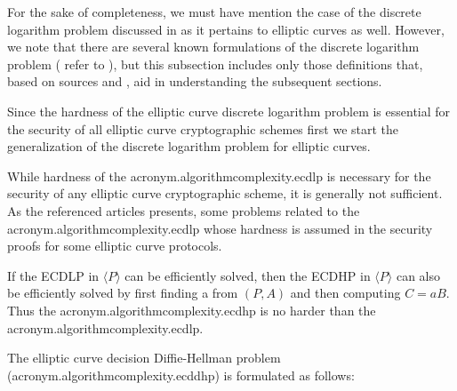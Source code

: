 For the sake of completeness, we must have mention the case of the discrete logarithm problem discussed in  as it pertains to elliptic curves as well.  However, we note that there are several known formulations of the discrete logarithm problem ( refer to \cite{maya6} ), but this subsection includes only those definitions that, based on sources \cite{menezes2004ECC} and \cite{BF01}, aid in understanding the subsequent sections. 

Since the hardness of the elliptic curve discrete logarithm problem is essential for the security of all elliptic curve cryptographic schemes first we start the generalization of the discrete logarithm problem for elliptic curves.



While hardness of the \acs{acronym.algorithmcomplexity.ecdlp} is necessary for the security of any elliptic curve cryptographic scheme, it is generally not sufficient. As the referenced articles presents, some problems related to the \acs{acronym.algorithmcomplexity.ecdlp} whose hardness is assumed in the security proofs for some elliptic curve protocols.


If the ECDLP in $\langle P \rangle$ can be efficiently solved, then the ECDHP in $\langle P \rangle$ can also be efficiently solved by first finding a from $(P, A)$ and then computing $C = a B$. Thus the \acs{acronym.algorithmcomplexity.ecdhp} is no harder than the \acs{acronym.algorithmcomplexity.ecdlp}.


The elliptic curve decision Diffie-Hellman problem (\acs{acronym.algorithmcomplexity.ecddhp}) is formulated as follows:


